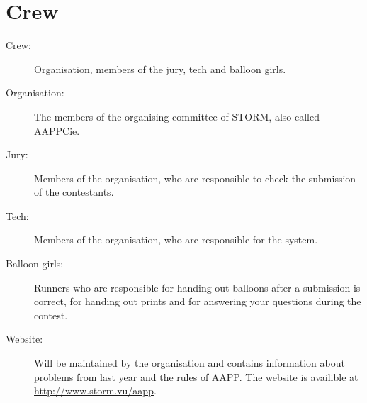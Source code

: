 \section{Crew}
\begin{description}
\item[Crew:]
Organisation, members of the jury, tech and balloon girls.

\item[Organisation:]
The members of the organising committee of STORM, also called AAPPCie.

\item[Jury:]
Members of the organisation, who are responsible to check the submission of the contestants.

\item[Tech:]
Members of the organisation, who are responsible for the system.

\item[Balloon girls:]
Runners who are responsible for handing out balloons after a submission is correct, for handing out prints and for answering your questions during the contest.

\item[Website:]
Will be maintained by the organisation and contains information about problems from last year and the rules of AAPP. The website is availible at \url{http://www.storm.vu/aapp}.
\end{description}